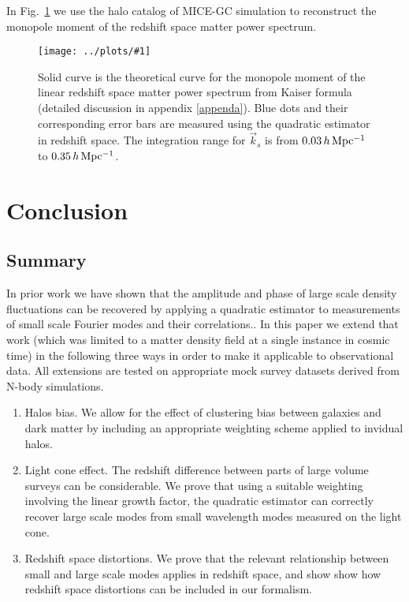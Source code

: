 \documentclass[prd,amsmath,amssymb,floatfix,superscriptaddress,nofootinbib,twocolumn]{revtex4-1}
\newcommand{\vk}{\vec{k}}
\newcommand{\rf}[1]{\ref{fig:#1}}
\newcommand{\sfig}[2]{
\texttt{[image: ../plots/\#1]}
        }
\newcommand{\Sfig}[2]{
   \begin{figure}[thbp]
   \begin{center}
    \sfig{../plots/#1.pdf}{\columnwidth}
    \caption{{\small #2}}
    \label{fig:#1}
     \end{center}
   \end{figure}
}
\begin{document}
In Fig.~\rf{SN_RS} we use the halo catalog of MICE-GC simulation to reconstruct the monopole moment of the redshift space matter power spectrum.

\Sfig{SN_RS}{Solid curve is the theoretical curve for the monopole moment of the linear redshift space matter power spectrum from Kaiser formula (detailed discussion in appendix \ref{appenda}). Blue dots and their corresponding error bars are measured using the quadratic estimator in redshift space. The integration range for $\vk_s$ is from $0.03 \,h \,\rm Mpc^{-1}$ to $0.35\,h\,\rm Mpc^{-1}$.}

\section{Conclusion} \label{sec8}
\subsection{Summary}
In prior work \cite{Li:2020fir} we have shown that the amplitude and phase of
large scale density fluctuations can be recovered  by applying a quadratic
estimator to measurements of
small scale Fourier  modes and their correlations..
In this paper we extend that work
(which was limited to a matter density field at a single instance in
cosmic time) in the following three ways in order to make it applicable
to observational data. All extensions
are tested on appropriate mock survey
datasets derived from N-body simulations.

\begin{enumerate}
\item  Halos bias. We allow for the effect of clustering bias between
  galaxies and dark matter by including an appropriate weighting scheme
  applied to invidual halos.

\item Light cone effect. The redshift difference between parts of large
  volume surveys can be considerable. We prove that using a suitable
  weighting involving the linear growth factor, the quadratic estimator
  can correctly recover large scale modes from small wavelength modes
  measured on the light cone.

\item Redshift space distortions.  We  prove that the relevant relationship
  between small and large scale modes applies in redshift space, and show
 show how redshift space distortions
 can be included in our formalism.
\end{enumerate}
 
\end{document}

